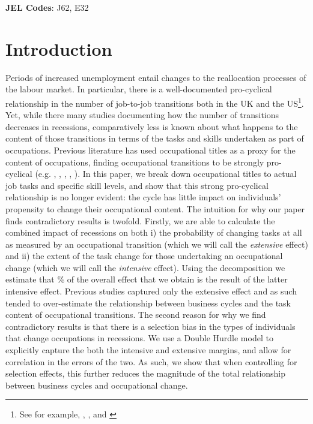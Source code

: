 \documentclass[11pt, oneside]{article}
\begin{document}
	\textbf{JEL Codes}: J62, E32
	
	\newpage
	\doublespacing
	\section{Introduction}
	\label{sec:Introduction}
	
	Periods of increased unemployment entail changes to the reallocation processes of the labour market. In particular, there is a well-documented pro-cyclical relationship in the number of job-to-job transitions both in the UK and the US\footnote{See for example, \cite{Carrillo-Tudela2016},  \cite{MurphyTopel1987}, \cite{Moscarini2007} and \cite{Kambourov2008}}. Yet, while there many studies documenting how the number of transitions decreases in recessions, comparatively less is known about what happens to the content of those transitions in terms of the tasks and skills undertaken as part of occupations. Previous literature has used occupational titles as a proxy for the content of occupations, finding occupational transitions to be strongly pro-cyclical (e.g. \cite{MurphyTopel1987}, \cite{Moscarini2007}, \cite{Kambourov2008}, \cite{Carrillo-Tudela2014}, \cite{Carrillo-Tudela2016}).
In this paper, we break down occupational titles to actual job tasks and specific skill levels, and show that this strong pro-cyclical relationship is no longer evident: the cycle has little impact on individuals' propensity to change their occupational content. The intuition for why our paper finds contradictory results is twofold.  Firstly, we are able to calculate the combined impact of recessions on both i) the probability of changing tasks at all as measured by an occupational transition (which we will call the \textit{extensive} effect) and ii) the extent of the task change for those undertaking an occupational change (which we will call the \textit{intensive} effect). Using the \cite{Mcdonald1980} decomposition we estimate that \hspace{-1mm}\% of the overall effect that we obtain is the result of the latter intensive effect. Previous studies captured only the extensive effect and as such tended to over-estimate the relationship between business cycles and the task content of occupational transitions. The second reason for why we find contradictory results is that there is a selection bias in the types of individuals that change occupations in recessions. We use a Double Hurdle model to explicitly capture the both the intensive and extensive margins, and allow for correlation in the errors of the two. As such, we show that when controlling for selection effects, this further reduces the magnitude of the total relationship between business cycles and occupational change.
	
\end{document}
